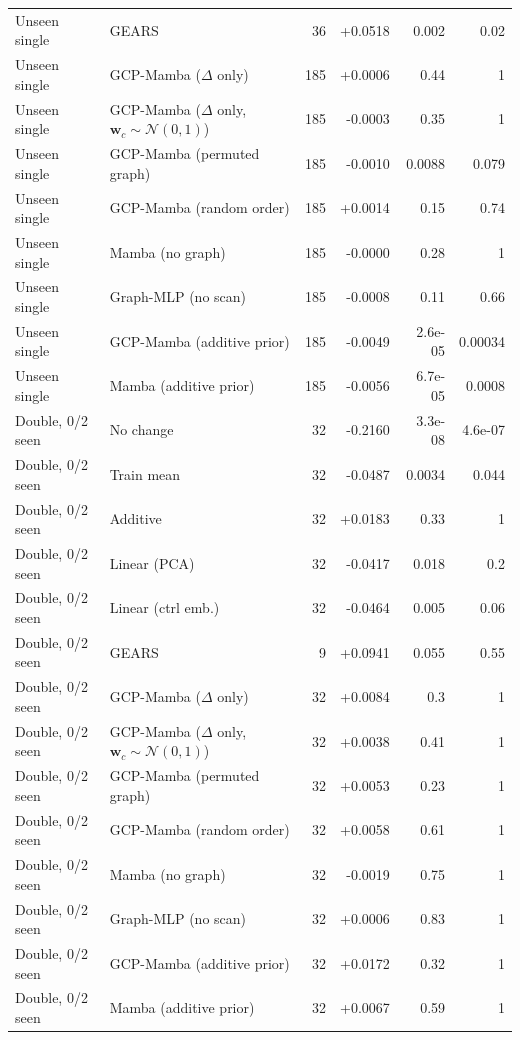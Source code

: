 \begin{longtable}{llrrrr}
Unseen single & GEARS & 36 & +0.0518 & 0.002 & 0.02 \\
Unseen single & GCP-Mamba ($\Delta$ only) & 185 & +0.0006 & 0.44 & 1 \\
Unseen single & GCP-Mamba ($\Delta$ only, $\mathbf{w}_c\sim\mathcal{N}(0,1)$) & 185 & -0.0003 & 0.35 & 1 \\
Unseen single & GCP-Mamba (permuted graph) & 185 & -0.0010 & 0.0088 & 0.079 \\
Unseen single & GCP-Mamba (random order) & 185 & +0.0014 & 0.15 & 0.74 \\
Unseen single & Mamba (no graph) & 185 & -0.0000 & 0.28 & 1 \\
Unseen single & Graph-MLP (no scan) & 185 & -0.0008 & 0.11 & 0.66 \\
Unseen single & GCP-Mamba (additive prior) & 185 & -0.0049 & 2.6e-05 & 0.00034 \\
Unseen single & Mamba (additive prior) & 185 & -0.0056 & 6.7e-05 & 0.0008 \\
\midrule
Double, 0/2 seen & No change & 32 & -0.2160 & 3.3e-08 & 4.6e-07 \\
Double, 0/2 seen & Train mean & 32 & -0.0487 & 0.0034 & 0.044 \\
Double, 0/2 seen & Additive & 32 & +0.0183 & 0.33 & 1 \\
Double, 0/2 seen & Linear (PCA) & 32 & -0.0417 & 0.018 & 0.2 \\
Double, 0/2 seen & Linear (ctrl emb.) & 32 & -0.0464 & 0.005 & 0.06 \\
Double, 0/2 seen & GEARS & 9 & +0.0941 & 0.055 & 0.55 \\
Double, 0/2 seen & GCP-Mamba ($\Delta$ only) & 32 & +0.0084 & 0.3 & 1 \\
Double, 0/2 seen & GCP-Mamba ($\Delta$ only, $\mathbf{w}_c\sim\mathcal{N}(0,1)$) & 32 & +0.0038 & 0.41 & 1 \\
Double, 0/2 seen & GCP-Mamba (permuted graph) & 32 & +0.0053 & 0.23 & 1 \\
Double, 0/2 seen & GCP-Mamba (random order) & 32 & +0.0058 & 0.61 & 1 \\
Double, 0/2 seen & Mamba (no graph) & 32 & -0.0019 & 0.75 & 1 \\
Double, 0/2 seen & Graph-MLP (no scan) & 32 & +0.0006 & 0.83 & 1 \\
Double, 0/2 seen & GCP-Mamba (additive prior) & 32 & +0.0172 & 0.32 & 1 \\
Double, 0/2 seen & Mamba (additive prior) & 32 & +0.0067 & 0.59 & 1 \\
\midrule

\end{longtable}
